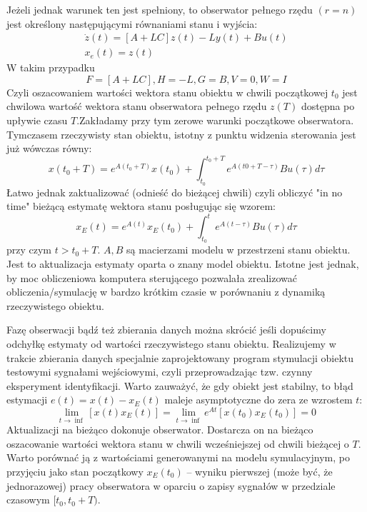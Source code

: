 \documentclass{article}
\begin{document}
		Jeżeli jednak warunek ten jest spełniony, to obserwator pełnego rzędu $(r=n)$ jest
		określony następującymi równaniami stanu i wyjścia:
		\begin{align*}
			\dot{z}(t) = [A + LC]z(t) - Ly(t) + Bu(t) \\ 
			x_e(t) = z(t)
		\end{align*}
		W takim przypadku
		\begin{equation}
			F = [A+LC], H = -L , G=B, V=0, W=I
		\end{equation}
		Czyli oszacowaniem wartości wektora stanu obiektu w chwili początkowej $t_0$
		jest chwilowa wartość wektora stanu obserwatora pełnego rzędu $z(T)$
		dostępna po upływie czasu $T$.Zakładamy przy tym zerowe warunki początkowe obserwatora.
		Tymczasem rzeczywisty stan obiektu, istotny z punktu widzenia sterowania jest już wówczas równy:
		\begin{equation}
			x(t_0+T) = e^{A(t_0+T)} x(t_0) + \int^{t_0 + T}_{t_0}e^{A(t0 +T−\tau)} Bu(\tau)d\tau
		\end{equation}
		Łatwo jednak zaktualizować (odnieść do bieżącej chwili) czyli obliczyć "in no time"
		bieżącą estymatę wektora stanu posługując się wzorem:
		\begin{equation}
			x_E(t) = e^{A(t)} x_E(t_0)+\int^t_{t_0}e^{A(t−\tau)} Bu(\tau)d\tau
		\end{equation}
		przy czym $t > t_0 + T$. $A, B$ są macierzami modelu w przestrzeni stanu obiektu. Jest to
		aktualizacja estymaty oparta o znany model obiektu. Istotne jest jednak, by moc
		obliczeniowa komputera sterującego pozwalała zrealizować obliczenia/symulację w
		bardzo krótkim czasie w porównaniu z dynamiką rzeczywistego obiektu.

		Fazę obserwacji bądź też zbierania danych można skrócić jeśli dopuścimy
		odchyłkę estymaty od wartości rzeczywistego stanu obiektu.
		Realizujemy w trakcie zbierania danych specjalnie zaprojektowany program 
		stymulacji obiektu testowymi sygnałami wejściowymi, czyli przeprowadzając 
		tzw. czynny eksperyment identyfikacji.
		Warto zauważyć, że gdy obiekt jest stabilny, to błąd estymacji $e(t)=x(t)-x_E(t)$ maleje
		asymptotyczne do zera ze wzrostem $t$:
		\begin{equation}
			\lim_{t \to \inf} [ x(t) x_E (t)] = \lim_{t \to \inf} e^{At}[ x(t_0) x_E (t_0)] = 0 
		\end{equation}
		Aktualizacji na bieżąco dokonuje obserwator. Dostarcza on na bieżąco oszacowanie
		wartości wektora stanu w chwili wcześniejszej od chwili bieżącej o $T$.
		Warto porównać ją z wartościami
		generowanymi na modelu symulacyjnym, po przyjęciu jako stan początkowy $x_E (t_0)$ –
		wyniku pierwszej (może być, że jednorazowej) pracy obserwatora w oparciu o zapisy
		sygnałów w przedziale czasowym $[t_0 , t_0+ T)$.
\end{document}
